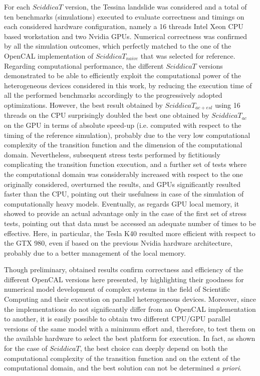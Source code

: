 For each $SciddicaT$ version, the Tessina landslide was considered
and a total of ten benchmarks (simulations) executed to evaluate
correctness and timings on each considered hardware configuration,
namely a 16 threads Intel Xeon CPU based workstation and two Nvidia
GPUs. Numerical correctness was confirmed by all the simulation
outcomes, which perfectly matched to the one of the OpenCAL
implementation of $SciddicaT_{naive}$ that was selected for
reference. Regarding computational performance, the different
$SciddicaT$ versions demonstrated to be able to efficiently exploit
the computational power of the heterogeneous devices considered in
this work, by reducing the execution time of all the performed
benchmarks accordingly to the progressively adopted
optimizations. However, the best result obtained by
$SciddicaT_{ac+esl}$ using 16 threads on the CPU surprisingly
doubled the best one obtained by $SciddicaT_{ac}$ on the GPU in
terms of absolute speed-up (i.e. computed with respect to the timing
of the reference simulation), probably due to the very low
computational complexity of the transition function and the
dimension of the computational domain. Nevertheless, subsequent
stress tests performed by fictitiously complicating the transition
function execution, and a further set of tests where the
computational domain was considerably increased with respect to the
one originally considered, overturned the results, and GPUs
significantly resulted faster than the CPU, pointing out their
usefulness in case of the simulation of computationally heavy
models. Eventually, as regards GPU local memory, it showed to
provide an actual advantage only in the case of the first set of
stress tests, pointing out that data must be accessed an adequate
number of times to be effective. Here, in particular, the Tesla K40
resulted more efficient with respect to the GTX 980, even if based
on the previous Nvidia hardware architecture, probably due to a
better management of the local memory.

Though preliminary, obtained results confirm correctness and
efficiency of the different OpenCAL versions here presented, by
highlighting their goodness for numerical model development of
complex systems in the field of Scientific Computing and their
execution on parallel heterogeneous devices. Moreover, since the
implementations do not significantly differ from an OpenCAL
implementation to another, it is easily possible to obtain two
different CPU/GPU parallel versions of the same model with a minimum
effort and, therefore, to test them on the available hardware to
select the best platform for execution. In fact, as shown for the
case of $SciddicaT$, the best choice can deeply depend on both the
computational complexity of the transition function and on the
extent of the computational domain, and the best solution can not be
determined \emph{a priori}.

